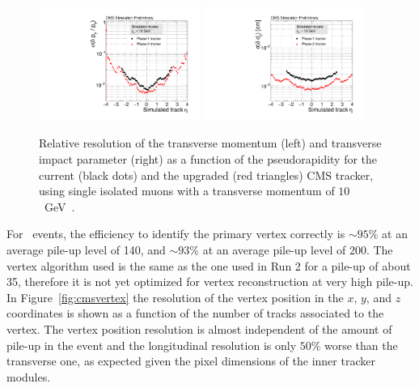 \begin{figure}[t]
\begin{center}
  \includegraphics[width=0.47\textwidth]{figures/cmsupgrade/TDR-17-001_fig6_12_a_ptres_vs_eta_Sigma_vsPhase1.pdf} \hfill
  \includegraphics[width=0.47\textwidth]{figures/cmsupgrade/TDR-17-001_fig6_12_b_dxyres_vs_eta_Sigma_vsPhase1.pdf}
  \caption{Relative resolution of the transverse momentum (left) and transverse impact parameter (right) as a function of the pseudorapidity for the current (black dots) and the upgraded (red triangles) CMS tracker, using single isolated muons with a transverse momentum of $10$~GeV~\cite{Collaboration:2272264}.}
  \label{fig:cmstrackres}
\end{center}
\end{figure}

For \ttbar~events, the efficiency to identify the primary vertex correctly is $\sim 95\%$ at an average pile-up level of 140, and $\sim93\%$ at an average pile-up level of 200. The vertex algorithm used is the same as the one used in Run 2 for a pile-up of about 35, therefore it is not yet optimized for vertex reconstruction at very high pile-up. In Figure~\ref{fig:cmsvertex} the resolution of the vertex position in the $x$, $y$, and $z$ coordinates is shown as a function of the number of tracks associated to the vertex. The vertex position resolution is almost independent of the amount of pile-up in the event and the longitudinal resolution is only $50\%$ worse than the transverse one, as expected given the pixel dimensions of the inner tracker modules.

